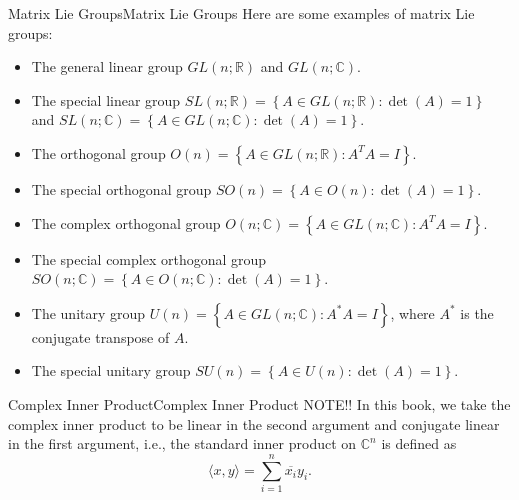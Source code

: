 \documentclass[../main.tex]{subfiles}
\begin{document}
\begin{example}{Matrix Lie Groups}{Matrix Lie Groups}
	Here are some examples of matrix Lie groups:
	\begin{itemize}
		\item The general linear group $GL(n;\mathbb{R})$ and $GL(n;\mathbb{C})$.
		\item The special linear group $SL(n;\mathbb{R}) = \left\{ A \in GL(n;\mathbb{R}) : \det(A) = 1 \right\}$ and $SL(n;\mathbb{C}) = \left\{ A \in GL(n;\mathbb{C}) : \det(A) = 1 \right\}$.
		\item The orthogonal group $O(n) = \left\{ A \in GL(n;\mathbb{R}) : A^T A = I \right\}$.
		\item The special orthogonal group $SO(n) = \left\{ A \in O(n) : \det(A) = 1 \right\}$.
		\item The complex orthogonal group $O(n;\mathbb{C}) = \left\{ A \in GL(n;\mathbb{C}) : A^T A = I \right\}$.
		\item The special complex orthogonal group $SO(n;\mathbb{C}) = \left\{ A \in O(n;\mathbb{C}) : \det(A) = 1 \right\}$.
		\item The unitary group $U(n) = \left\{ A \in GL(n;\mathbb{C}) : A^* A = I \right\}$, where $A^*$ is the conjugate transpose of $A$.
		\item The special unitary group $SU(n) = \left\{ A \in U(n) : \det(A) = 1 \right\}$.
	\end{itemize}
\end{example}

\begin{notation}{Complex Inner Product}{Complex Inner Product}
	NOTE!! In this book, we take the complex inner product to be linear in the second argument and conjugate linear in the first argument, i.e., the standard inner product on $\mathbb{C}^n$ is defined as
	\begin{equation*}
		\langle x, y \rangle = \sum_{i=1}^n \overline{x_i} y_i.
	\end{equation*}
\end{notation}
\end{document}
